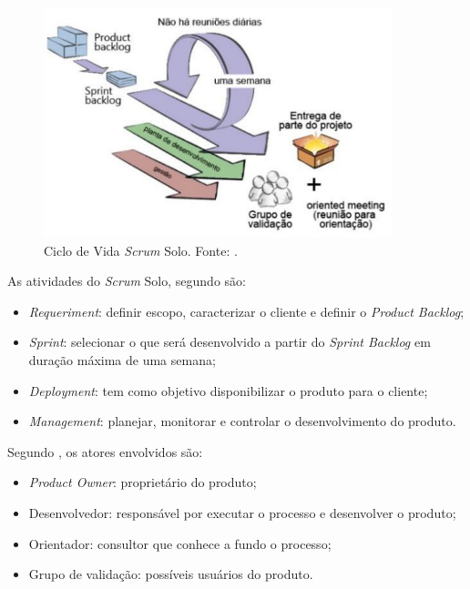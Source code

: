 \begin{figure}[H]
	\centering
	\includegraphics[width=0.9\textwidth]{figuras/fluxoScrumSolo.png}
	\caption{Ciclo de Vida \textit{Scrum} Solo. Fonte: .}
	\label{img:ciclo_scrum_solo}
\end{figure}

As atividades do \textit{Scrum} Solo, segundo  são:

\begin{itemize}
	\item \textit{Requeriment}: definir escopo, caracterizar o cliente e definir o \textit{Product Backlog}; 
	\item \textit{Sprint}: selecionar o que será desenvolvido a partir do \textit{Sprint Backlog} em duração máxima de uma semana;
	\item \textit{Deployment}: tem como objetivo disponibilizar o produto para o cliente;
	\item \textit{Management}: planejar, monitorar e controlar o desenvolvimento do produto.
\end{itemize}

Segundo , os atores envolvidos são:

\begin{itemize}
	\item \textit{Product Owner}: proprietário do produto;
	\item Desenvolvedor: responsável por executar o processo e desenvolver o produto;
	\item Orientador: consultor que conhece a fundo o processo;
	\item Grupo de validação: possíveis usuários do produto.
\end{itemize}

